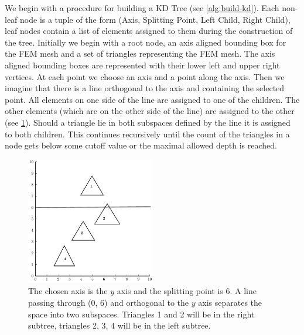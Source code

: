 We begin with a procedure for building a KD Tree (see \cref{alg:build-kd}). Each non-leaf node is a tuple of the form (Axis, Splitting Point, Left Child, Right Child), leaf nodes contain a list of elements assigned to them during the construction of the tree. Initially we begin with a root node, an axis aligned bounding box for the FEM mesh and a set of triangles representing the FEM mesh. The axis aligned bounding boxes are represented with their lower left and upper right vertices. At each point we choose an axis and a point along the axis. Then we imagine that there is a line orthogonal to the axis and containing the selected point. All elements on one side of the line are assigned to one of the children. The other elements (which are on the other side of the line) are assigned to the other (see \cref{fig:kd-build}). Should a triangle lie in both subspaces defined by the line it is assigned to both children. This continues recursively until the count of the triangles in a node gets below some cutoff value or the maximal allowed depth is reached.

\begin{figure}
  \centering
  \includegraphics[width=0.5\textwidth]{Figures/kd-example.pdf}
  \caption{The chosen axis is the $y$ axis and the splitting point is 6. A line passing through (0, 6) and orthogonal to the $y$ axis separates the space into two subspaces. Triangles 1 and 2 will be in the right subtree, triangles 2, 3, 4 will be in the left subtree.}\label{fig:kd-build}
\end{figure}

